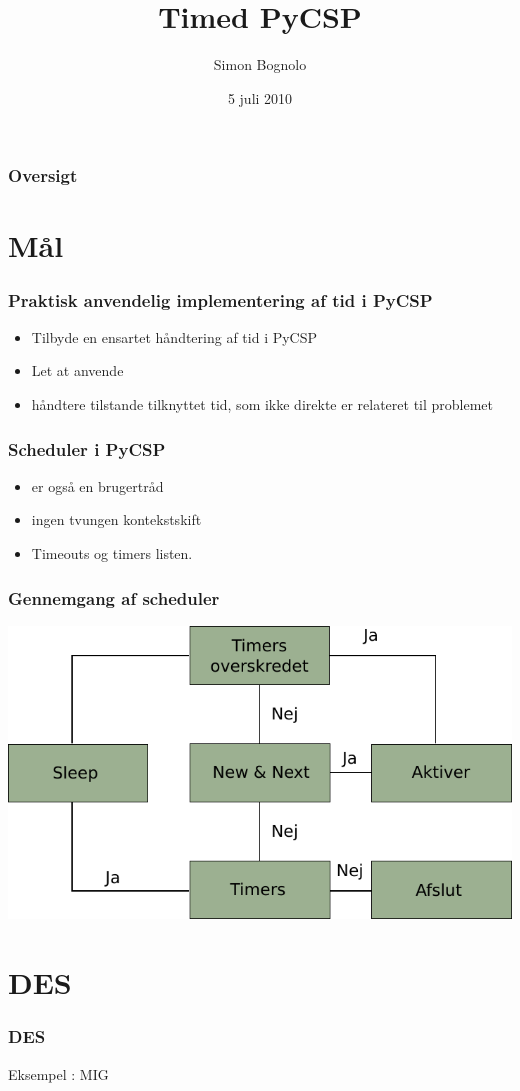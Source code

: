 \documentclass[12pt]{beamer}
\title
{Timed PyCSP}
\institute
{Datalogisk Institut \\ Københavns Universitet}
\author
{Simon Bognolo}
\date
{5 juli 2010}
\begin{document}
\frame[plain]\titlepage
 
\begin{frame}
  \frametitle{Oversigt}
  \tableofcontents
\end{frame}

\section{Mål}
\begin{frame}
  \frametitle{Praktisk anvendelig implementering af tid i PyCSP}
  \begin{itemize}
	\item Tilbyde en ensartet håndtering af tid i PyCSP
	\item Let at anvende
	\item håndtere tilstande tilknyttet tid, som ikke direkte er relateret til problemet
  \end{itemize}
\end{frame}

\begin{frame}
  \frametitle{Scheduler i PyCSP}
  \begin{itemize}
	\item er også en brugertråd
	\item ingen tvungen kontekstskift
	\item Timeouts og timers listen.
  \end{itemize}
\end{frame}

\begin{frame}
  \frametitle{Gennemgang af scheduler}
  \includegraphics[scale=0.9]{pycsp-scheduler} 
\end{frame}

\section{DES}
\begin{frame}
  \frametitle{DES}
Eksempel : MIG 
\end{frame}
\end{document}
